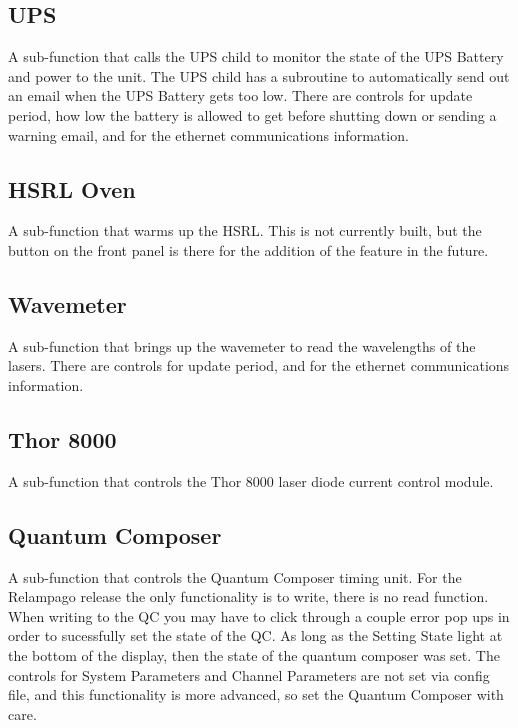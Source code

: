\subsection{UPS}\label{Sec:UPSSubFunction}

A sub-function that calls the UPS child to monitor the state of the UPS Battery and power to the unit. The UPS child has a subroutine to automatically send out an email when the UPS Battery gets too low. There are controls for update period, how low the battery is allowed to get before shutting down or sending a warning email, and for the ethernet communications information. 

\subsection{HSRL Oven}\label{Sec:HSRLOvenSubFunction}

A sub-function that warms up the HSRL. This is not currently built, but the button on the front panel is there for the addition of the feature in the future. 

\subsection{Wavemeter}\label{Sec:WavemeterSubFunction}

A sub-function that brings up the wavemeter to read the wavelengths of the lasers. There are controls for update period, and for the ethernet communications information. 

\subsection{Thor 8000}\label{Sec:T8000SubFunction}

A sub-function that controls the Thor 8000 laser diode current control module. 

\subsection{Quantum Composer}\label{Sec:QCSubFunction}

A sub-function that controls the Quantum Composer timing unit. For the Relampago release the only functionality is to write, there is no read function. When writing to the QC you may have to click through a couple error pop ups in order to sucessfully set the state of the QC. As long as the Setting State light at the bottom of the display, then the state of the quantum composer was set. The controls for System Parameters and Channel Parameters are not set via config file, and this functionality is more advanced, so set the Quantum Composer with care. 

